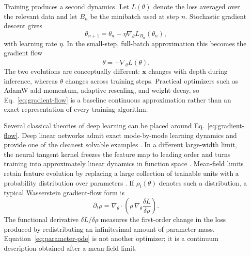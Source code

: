 \documentclass[11pt]{article}
\begin{document}
Training produces a second dynamics. Let $L(\theta)$ denote the loss averaged over the relevant data and let $B_n$ be the minibatch used at step $n$. Stochastic gradient descent gives
\begin{equation}
\theta_{n+1}
=
\theta_n
-
\eta\nabla_\theta L_{B_n}(\theta_n),
\label{eq:sgd}
\end{equation}
with learning rate $\eta$. In the small-step, full-batch approximation this becomes the gradient flow
\begin{equation}
\dot\theta
=
-\nabla_\theta L(\theta).
\label{eq:gradient-flow}
\end{equation}
The two evolutions are conceptually different: $\mathbf x$ changes with depth during inference, whereas $\theta$ changes across training steps. Practical optimizers such as AdamW add momentum, adaptive rescaling, and weight decay, so Eq.~\eqref{eq:gradient-flow} is a baseline continuous approximation rather than an exact representation of every training algorithm.

Several classical theories of deep learning can be placed around Eq.~\eqref{eq:gradient-flow}. Deep linear networks admit exact mode-by-mode learning dynamics and provide one of the cleanest solvable examples \cite{saxe2014}. In a different large-width limit, the neural tangent kernel freezes the feature map to leading order and turns training into approximately linear dynamics in function space \cite{jacot2018}. Mean-field limits retain feature evolution by replacing a large collection of trainable units with a probability distribution over parameters \cite{chizat2018}. If $\rho_t(\theta)$ denotes such a distribution, a typical Wasserstein gradient-flow form is
\begin{equation}
\partial_t\rho
=
\nabla_\theta\cdot
\left(
\rho\,
\nabla_\theta
\frac{\delta L}{\delta\rho}
\right).
\label{eq:parameter-pde}
\end{equation}
The functional derivative $\delta L/\delta\rho$ measures the first-order change in the loss produced by redistributing an infinitesimal amount of parameter mass. Equation~\eqref{eq:parameter-pde} is not another optimizer; it is a continuum description obtained after a mean-field limit.
\end{document}
